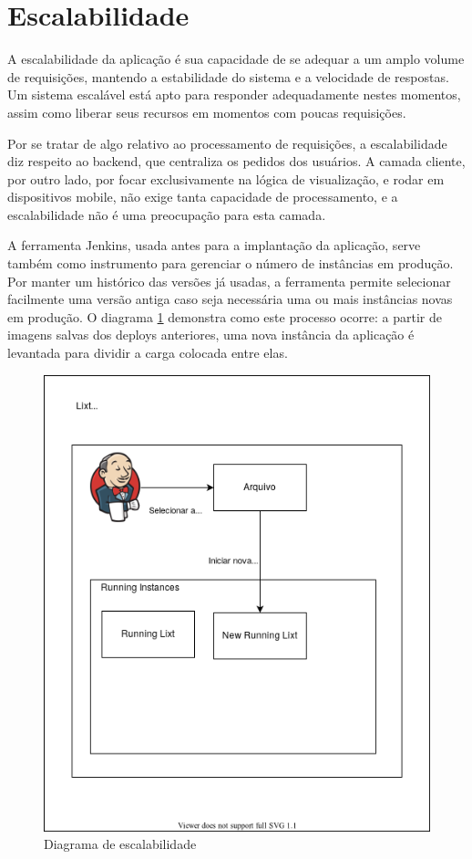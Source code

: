 \section{Escalabilidade}

A escalabilidade da aplicação é sua capacidade de se adequar a um
amplo volume de requisições, mantendo a estabilidade do sistema e a
velocidade de respostas. Um sistema escalável está apto para responder
adequadamente nestes momentos, assim como liberar seus recursos em
momentos com poucas requisições.

Por se tratar de algo relativo ao processamento de requisições, a
escalabilidade diz respeito ao \gls{backend}, que centraliza os
pedidos dos usuários. A camada cliente, por outro lado, por focar
exclusivamente na lógica de visualização, e rodar em dispositivos
mobile, não exige tanta capacidade de processamento, e a
escalabilidade não é uma preocupação para esta camada.

A ferramenta Jenkins, usada antes para a implantação da aplicação,
serve também como instrumento para gerenciar o número de instâncias em
produção. Por manter um histórico das versões já usadas, a ferramenta
permite selecionar facilmente uma versão antiga caso seja necessária
uma ou mais instâncias novas em produção. O diagrama
\ref{fig:escalabilidade} demonstra como este processo ocorre: a
partir de imagens salvas dos \glspl{deploy} anteriores, uma nova
instância da aplicação é levantada para dividir a carga colocada entre
elas.

\begin{figure}[H]
  \centering
  \caption{Diagrama de escalabilidade}
  \label{fig:escalabilidade}
  \includegraphics[scale=0.50]{images/escalar}
\end{figure}

